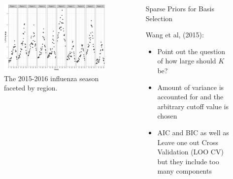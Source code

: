 \documentclass[final]{beamer}
\newlength{\sepwid}
\newlength{\onecolwid}
\newlength{\twocolwid}
\begin{document}
\begin{frame}[t]
\begin{columns}[t]
\begin{column}{\onecolwid}

\begin{figure}
\includegraphics[width=\linewidth]{plots/ILI.png}
\caption{The 2015-2016 influenza season faceted by region.}
\end{figure}


\end{column} %

\begin{column}{\sepwid}\end{column} %

\begin{column}{\twocolwid} %

\begin{columns}[t,totalwidth=\twocolwid] %

\begin{column}{\onecolwid}\vspace{-.6in} %


\begin{block}{Sparse Priors for Basis Selection}

Wang et al, (2015):
\begin{itemize}
\item Point out the question of how large should $K$ be?
\item Amount of variance is accounted for and the arbitrary cutoff value is chosen
\item AIC and BIC as well as Leave one out Cross Validation (LOO CV) but they include too many components \\
\end{itemize}


\end{block}
\end{column}
\end{columns}
\end{column}
\end{columns}
\end{frame}
\end{document}
